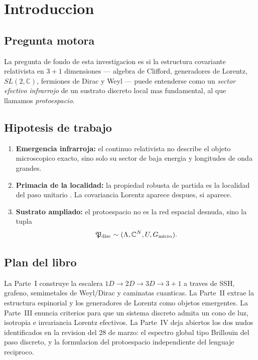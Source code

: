 \chapter{Introduccion}

\section{Pregunta motora}

La pregunta de fondo de esta investigacion es si la estructura covariante
relativista en $3+1$ dimensiones --- algebra de Clifford, generadores de
Lorentz, $SL(2,\mathbb{C})$, fermiones de Dirac y Weyl --- puede entenderse
como un \emph{sector efectivo infrarrojo} de un sustrato discreto local mas
fundamental, al que llamamos \emph{protoespacio}.

\section{Hipotesis de trabajo}

\begin{enumerate}[label=(H\arabic*)]
  \item \textbf{Emergencia infrarroja:} el continuo relativista no describe el
        objeto microscopico exacto, sino solo su sector de baja energia y
        longitudes de onda grandes.
  \item \textbf{Primacia de la localidad:} la propiedad robusta de partida es
        la localidad del paso unitario \Uop. La covariancia Lorentz aparece
        despues, si aparece.
  \item \textbf{Sustrato ampliado:} el protoespacio no es la red espacial
        desnuda, sino la tupla
        \[\mathfrak{P}_{\mathrm{disc}} \sim (\Lambda,\mathbb{C}^N,U,G_{\mathrm{micro}}).\]
\end{enumerate}

\section{Plan del libro}

La Parte~I construye la escalera $1D \to 2D \to 3D \to 3+1$ a traves de SSH,
grafeno, semimetales de Weyl/Dirac y caminatas cuanticas. La Parte~II extrae
la estructura espinorial y los generadores de Lorentz como objetos
emergentes. La Parte~III enuncia criterios para que un sistema discreto
admita un cono de luz, isotropia e invariancia Lorentz efectivos. La
Parte~IV deja abiertos los dos nudos identificados en la revision del 28 de
marzo: el espectro global tipo Brillouin del paso discreto, y la
formulacion del protoespacio independiente del lenguaje reciproco.
